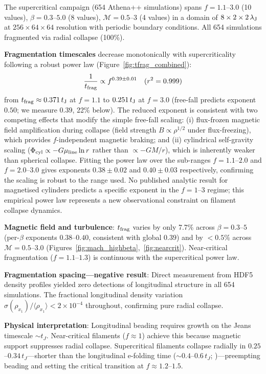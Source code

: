 \documentclass[twoside,twocolumn]{mnras}
\begin{document}
The supercritical campaign (654 Athena++ simulations) spans $f = 1.1$--$3.0$ (10 values),
$\beta = 0.3$--$5.0$ (8 values), $\mathcal{M} = 0.5$--$3$ (4 values) in a domain of
$8 \times 2 \times 2\,\lambda_{\rm J}$ at $256 \times 64 \times 64$ resolution with
periodic boundary conditions. All 654 simulations fragmented via radial collapse (100\%).

\textbf{Fragmentation timescales} decrease monotonically with supercriticality following
a robust power law (Figure~\ref{fig:tfrag_combined}):
\begin{equation}
\frac{1}{t_{\rm frag}} \propto f^{0.39 \pm 0.01} \quad (r^2 = 0.999)
\label{eq:powerlaw}
\end{equation}
from $t_{\rm frag} \approx 0.371\,t_{\rm J}$ at $f = 1.1$ to $0.251\,t_{\rm J}$ at
$f = 3.0$ (free-fall predicts exponent $0.50$; we measure $0.39$, 22\% below). The
reduced exponent is consistent with two competing effects that modify the simple
free-fall scaling: (i) flux-frozen magnetic field amplification during collapse
(field strength $B \propto \rho^{1/2}$ under flux-freezing), which provides
$f$-independent magnetic braking; and (ii) cylindrical self-gravity scaling
($\Phi_{\rm cyl} \propto -G\mu_{\rm line}\ln r$ rather than $\propto -GM/r$), which
is inherently weaker than spherical collapse. Fitting the power law over the
sub-ranges $f = 1.1$--$2.0$ and $f = 2.0$--$3.0$ gives exponents $0.38 \pm 0.02$
and $0.40 \pm 0.03$ respectively, confirming the scaling is robust to the range
used. No published analytic result for magnetised cylinders predicts a specific
exponent in the $f = 1$--$3$ regime; this empirical power law represents a new
observational constraint on filament collapse dynamics.

\textbf{Magnetic field and turbulence}: $t_{\rm frag}$ varies by only 7.7\% across
$\beta=0.3$--$5$ (per-$\beta$ exponents $0.38$--$0.40$, consistent with global $0.39$)
and by $<0.5\%$ across $\mathcal{M}=0.5$--$3.0$ (Figures~\ref{fig:mach_highbeta},~\ref{fig:nearcrit}).
Near-critical fragmentation ($f=1.1$--$1.3$) is continuous with the supercritical power law.

\textbf{Fragmentation spacing---negative result}: Direct measurement from HDF5 density
profiles yielded zero detections of longitudinal structure in all 654 simulations.
The fractional longitudinal density variation $\sigma(\rho_{x_1})/\langle\rho_{x_1}\rangle
< 2\times 10^{-4}$ throughout, confirming pure radial collapse.

\textbf{Physical interpretation}: Longitudinal beading requires growth on the Jeans
timescale $\sim t_J$. Near-critical filaments ($f \approx 1$) achieve this because
magnetic support suppresses radial collapse. Supercritical filaments collapse radially
in $0.25$--$0.34\,t_J$---shorter than the longitudinal e-folding time
(${\sim}0.4$--$0.6\,t_J$; \citealt{Nagasawa1987})---preempting beading and setting
the critical transition at $f \approx 1.2$--$1.5$.
\end{document}
